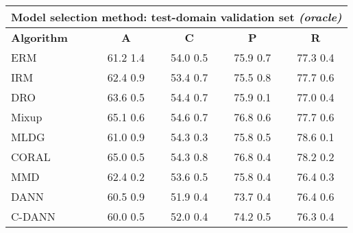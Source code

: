 \documentclass{article}
\begin{document}
\begin{center}
\begin{tabular}{lcccc}
\toprule
\multicolumn{5}{c}{\textbf{Model selection method: test-domain validation set \textit{(oracle)}}} \\
\midrule
\textbf{Algorithm}    & \textbf{A}                & \textbf{C}                & \textbf{P}                & \textbf{R}                \\
\midrule
ERM                       & 61.2  1.4            & 54.0  0.5            & 75.9  0.7            & 77.3  0.4            \\
IRM                       & 62.4  0.9            & 53.4  0.7            & 75.5  0.8            & 77.7  0.6            \\
DRO                 & 63.6  0.5            & 54.4  0.7            & 75.9  0.1            & 77.0  0.4            \\
Mixup                     & 65.1  0.6            & 54.6  0.7            & 76.8  0.6            & 77.7  0.6            \\
MLDG                      & 61.0  0.9            & 54.3  0.3            & 75.8  0.5            & 78.6  0.1            \\
CORAL                     & 65.0  0.5            & 54.3  0.8            & 76.8  0.4            & 78.2  0.2            \\
MMD                       & 62.4  0.2            & 53.6  0.5            & 75.8  0.4            & 76.4  0.3            \\
DANN                       & 60.5  0.9            & 51.9  0.4            & 73.7  0.4            & 76.4  0.6            \\
C-DANN                   & 60.0  0.5            & 52.0  0.4            & 74.2  0.5            & 76.3  0.4            \\
\bottomrule
\end{tabular}
\end{center}

\clearpage
\newpage
\end{document}
